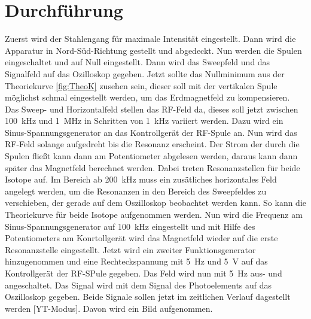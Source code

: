 \section{Durchführung}
\label{sec:Durchführung}
Zuerst wird der Stahlengang für maximale Intensität eingestellt. Dann wird die Apparatur in 
Nord-Süd-Richtung gestellt und abgedeckt. Nun werden die Spulen eingeschaltet und auf Null 
eingestellt. Dann wird das Sweepfeld und das Signalfeld auf das Ozilloskop gegeben. Jetzt 
sollte das Nullminimum aus der Theoriekurve \ref{fig:TheoK} zusehen sein, dieser soll mit 
der vertikalen Spule möglichst schmal eingestellt werden, um das Erdmagnetfeld zu kompensieren. 
Das Sweep- und Horizontalfeld stellen das RF-Feld da, dieses soll jetzt zwischen 
\SI{100}{\kilo\hertz} und \SI{1}{\mega\hertz} in Schritten von \SI{1}{\kilo\hertz} 
variiert werden. Dazu wird ein Sinus-Spannungsgenerator an das Kontrollgerät der RF-Spule an. 
Nun wird das RF-Feld solange aufgedreht bis die Resonanz erscheint. Der Strom der durch die 
Spulen fließt kann dann am Potentiometer abgelesen werden, daraus kann dann später das 
Magnetfeld berechnet werden. Dabei treten Resonanzstellen für beide Isotope auf. 
Im Bereich ab \SI{200}{\kilo\hertz} muss ein zusätliches horizontales Feld angelegt werden, um 
die Resonanzen in den Bereich des Sweepfeldes zu verschieben, der gerade auf dem 
Oszilloskop beobachtet werden kann. So kann die Theoriekurve für beide Isotope aufgenommen werden.
\newline 
Nun wird die Frequenz am Sinus-Spannungsgenerator auf \SI{100}{\kilo\hertz} eingestellt und mit 
Hilfe des Potentiometers am Konrtollgerät wird das Magnetfeld wieder auf die erste Resonanzstelle 
eingestellt. Jetzt wird ein zweiter Funktionsgenerator hinzugenommen und eine Rechteckspannung 
mit \SI{5}{\hertz} und \SI{5}{\volt} auf das Kontrollgerät der RF-SPule gegeben. Das Feld wird 
nun mit \SI{5}{\hertz} aus- und angeschaltet. Das Signal wird mit dem Signal des Photoelements 
auf das Oszilloskop gegeben. 
Beide Signale sollen jetzt im zeitlichen Verlauf dagestellt werden [YT-Modus]. 
Davon wird ein Bild aufgenommen.

